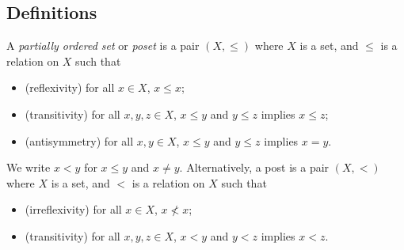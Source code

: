 \subsection{Definitions}
\begin{definition}
    A \emph{partially ordered set} or \emph{poset} is a pair \( (X, \leq) \) where \( X \) is a set, and \( \leq \) is a relation on \( X \) such that
    \begin{itemize}
        \item (reflexivity) for all \( x \in X \), \( x \leq x \);
        \item (transitivity) for all \( x, y, z \in X \), \( x \leq y \) and \( y \leq z \) implies \( x \leq z \);
        \item (antisymmetry) for all \( x, y \in X \), \( x \leq y \) and \( y \leq z \) implies \( x = y \).
    \end{itemize}
\end{definition}
We write \( x < y \) for \( x \leq y \) and \( x \neq y \).
Alternatively, a post is a pair \( (X, <) \) where \( X \) is a set, and \( < \) is a relation on \( X \) such that
\begin{itemize}
    \item (irreflexivity) for all \( x \in X \), \( x \not < x \);
    \item (transitivity) for all \( x, y, z \in X \), \( x < y \) and \( y < z \) implies \( x < z \).
\end{itemize}
